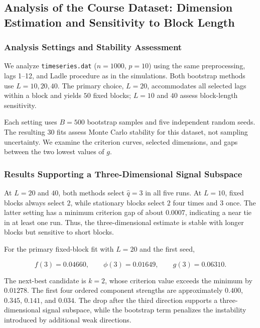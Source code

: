 \documentclass[
  english,
  11pt,
  a4paper,
]{article}
\begin{document}
\subsection{Analysis of the Course Dataset: Dimension Estimation and
Sensitivity to Block
Length}\label{analysis-of-the-course-dataset-dimension-estimation-and-sensitivity-to-block-length}

\subsubsection{Analysis Settings and Stability
Assessment}\label{analysis-settings-and-stability-assessment}

We analyze \texttt{timeseries.dat} (\(n=1000\), \(p=10\)) using the same
preprocessing, lags 1--12, and Ladle procedure as in the simulations.
Both bootstrap methods use \(L=10,20,40\). The primary choice, \(L=20\),
accommodates all selected lags within a block and yields \(50\) fixed
blocks; \(L=10\) and \(40\) assess block-length sensitivity.

Each setting uses \(B=500\) bootstrap samples and five independent
random seeds. The resulting \(30\) fits assess Monte Carlo stability for
this dataset, not sampling uncertainty. We examine the criterion curves,
selected dimensions, and gaps between the two lowest values of \(g\).

\subsubsection{Results Supporting a Three-Dimensional Signal
Subspace}\label{results-supporting-a-three-dimensional-signal-subspace}

At \(L=20\) and \(40\), both methods select \(\widehat q=3\) in all five
runs. At \(L=10\), fixed blocks always select \(2\), while stationary
blocks select \(2\) four times and \(3\) once. The latter setting has a
minimum criterion gap of about \(0.0007\), indicating a near tie in at
least one run. Thus, the three-dimensional estimate is stable with
longer blocks but sensitive to short blocks.

For the primary fixed-block fit with \(L=20\) and the first seed,

\[
f(3)=0.04660,\qquad \phi(3)=0.01649,\qquad g(3)=0.06310.
\]

The next-best candidate is \(k=2\), whose criterion value exceeds the
minimum by \(0.01278\). The first four ordered component strengths are
approximately \(0.400\), \(0.345\), \(0.141\), and \(0.034\). The drop
after the third direction supports a three-dimensional signal subspace,
while the bootstrap term penalizes the instability introduced by
additional weak directions.
\end{document}
